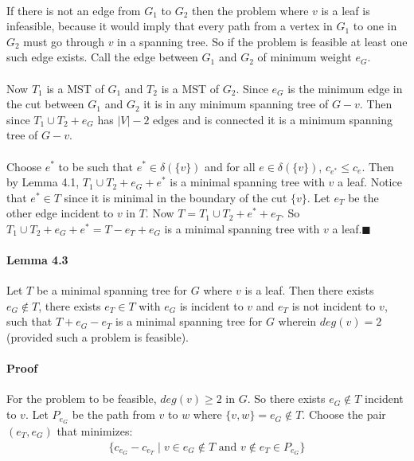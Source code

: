 \documentclass[letterpaper,12pt,oneside,onecolumn]{report}
\begin{document}
\paragraph{}
If there is not an edge from $G_1$ to $G_2$ then the problem where $v$ is a leaf is infeasible, because it would imply that every path from a vertex in $G_1$ to one in $G_2$ must go through $v$ in a spanning tree. So if the problem is feasible at least one such edge exists. Call the edge between $G_1$ and $G_2$ of minimum weight $e_G$.
\paragraph{}
Now $T_1$ is a MST of $G_1$ and $T_2$ is a MST of $G_2$. Since $e_G$ is the minimum edge in the cut between $G_1$ and $G_2$ it is in any minimum spanning tree of $G-v$. Then since $T_1 \cup T_2 + e_G$ has $|V| - 2$ edges and is connected it is a minimum spanning tree of $G - v$. 
\paragraph{}
Choose $e^*$ to be such that $e^* \in \delta(\{v\})$ and for all $e \in \delta(\{v\})$, $c_{e^*} \leq c_e$. Then by Lemma 4.1, $T_1 \cup T_2 + e_G + e^*$ is a minimal spanning tree with $v$ a leaf. Notice that $e^* \in T$ since it is minimal in the boundary of the cut $\{v\}$. Let $e_T$ be the other edge incident to $v$ in $T$. Now $T = T_1 \cup T_2 + e^* + e_T$. So $T_1 \cup T_2 + e_G + e^* = T - e_T+ e_G$ is a minimal spanning tree with $v$ a leaf.$\blacksquare$
\paragraph{Lemma 4.3}
Let $T$ be a minimal spanning tree for $G$ where $v$ is a leaf. Then there exists $e_G \not\in T$, there exists $e_T \in T$ with $e_G$ is incident to $v$ and $e_T$ is not incident to $v$, such that $T + e_G - e_T$ is a minimal spanning tree for $G$ wherein $deg(v) = 2$ (provided such a problem is feasible).
\paragraph{Proof}
For the problem to be feasible, $deg(v) \geq 2$ in $G$. So there exists $e_G \not\in T$ incident to $v$. Let $P_{e_G}$ be the path from $v$ to $w$ where $\{v,w\} = e_G \not\in T$. Choose the pair $(e_T, e_G)$ that minimizes:
\begin{align}
\{c_{e_G} - c_{e_T} \mid v \in e_G \not\in T \text{ and } v \not\in e_T \in P_{e_G} \}
\end{align}
\end{document}
